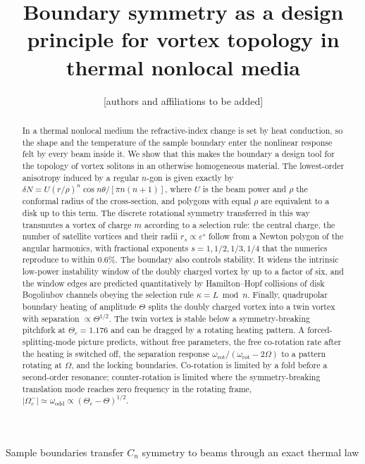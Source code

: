 \documentclass[preprint,12pt]{elsarticle}
\begin{document}
\begin{frontmatter}
\title{Boundary symmetry as a design principle for vortex topology in thermal nonlocal media}
\author{[authors and affiliations to be added]}
\begin{abstract}
In a thermal nonlocal medium the refractive-index change is set by heat conduction, so the shape and the temperature of the sample boundary enter the nonlinear response felt by every beam inside it. We show that this makes the boundary a design tool for the topology of vortex solitons in an otherwise homogeneous material. The lowest-order anisotropy induced by a regular \(n\)-gon is given exactly by \(\delta N = U (r/\rho)^n \cos n\theta / [\pi n (n+1)]\), where \(U\) is the beam power and \(\rho\) the conformal radius of the cross-section, and polygons with equal \(\rho\) are equivalent to a disk up to this term. The discrete rotational symmetry transferred in this way transmutes a vortex of charge \(m\) according to a selection rule: the central charge, the number of satellite vortices and their radii \(r_s \propto \varepsilon^s\) follow from a Newton polygon of the angular harmonics, with fractional exponents \(s = 1, 1/2, 1/3, 1/4\) that the numerics reproduce to within 0.6\%. The boundary also controls stability. It widens the intrinsic low-power instability window of the doubly charged vortex by up to a factor of six, and the window edges are predicted quantitatively by Hamilton--Hopf collisions of disk Bogoliubov channels obeying the selection rule \(\kappa = L \bmod n\). Finally, quadrupolar boundary heating of amplitude \(\Theta\) splits the doubly charged vortex into a twin vortex with separation \(\propto \Theta^{1/2}\). The twin vortex is stable below a symmetry-breaking pitchfork at \(\Theta_c = 1.176\) and can be dragged by a rotating heating pattern. A forced-splitting-mode picture predicts, without free parameters, the free co-rotation rate after the heating is switched off, the separation response \(\omega_\mathrm{rot}/(\omega_\mathrm{rot} - 2\Omega)\) to a pattern rotating at \(\Omega\), and the locking boundaries. Co-rotation is limited by a fold before a second-order resonance; counter-rotation is limited where the symmetry-breaking translation mode reaches zero frequency in the rotating frame, \(|\Omega_c^-| \simeq \omega_\mathrm{odd} \propto (\Theta_c - \Theta)^{1/2}\).
\end{abstract}
\begin{highlights}
\item Sample boundaries transfer \(C_n\) symmetry to beams through an exact thermal law

\end{highlights}
\end{frontmatter}
\end{document}
